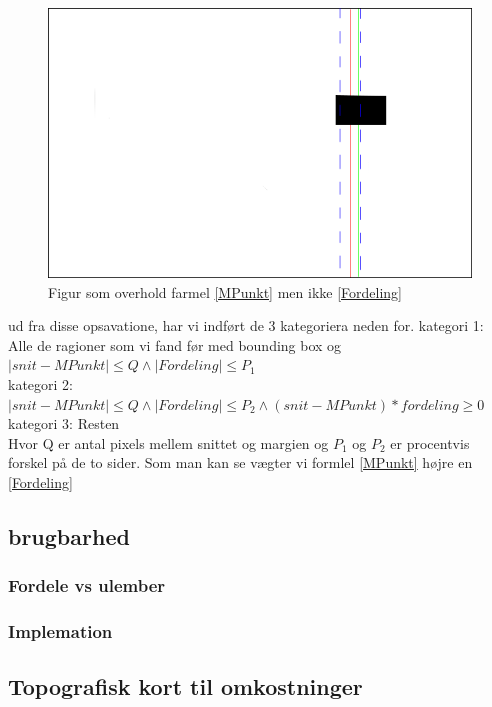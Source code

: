 \begin{figure}[h]
	\begin{center}
		\includegraphics[scale=0.5,angle=0]{afsnit/vores_implementation/billeder/udvidet_loesning/dontwork2.png}
	\end{center}
	\caption[]{Figur som overhold farmel \ref{MPunkt} men ikke \ref{Fordeling}}
	\label{dontwork2}
\end{figure}

ud fra disse opsavatione, har vi indført de 3 kategoriera neden for.
kategori 1: Alle de ragioner som vi fand før med bounding box og $ |snit - MPunkt| \leq Q \wedge |Fordeling| \leq P_1$ \\
kategori 2: $|snit - MPunkt| \leq Q \wedge |Fordeling| \leq P_2 \wedge (snit - MPunkt)*fordeling \geq 0$ \\
kategori 3: Resten\\

Hvor Q er antal pixels mellem snittet og margien og $P_1$ og $P_2$ er procentvis forskel på de to sider.
Som man kan se vægter vi formlel \ref{MPunkt} højre en \ref{Fordeling}


\subsection{brugbarhed}
\subsubsection{Fordele vs ulember}

\subsubsection{Implemation}

\subsection{Topografisk kort til omkostninger}

